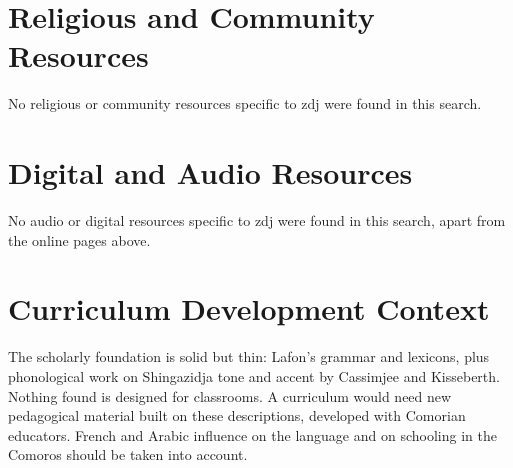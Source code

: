 \documentclass[12pt]{article}
\begin{document}
\section{Religious and Community Resources}
No religious or community resources specific to zdj were found in this search.

\section{Digital and Audio Resources}
No audio or digital resources specific to zdj were found in this search, apart from the online pages above.

\section{Curriculum Development Context}
The scholarly foundation is solid but thin: Lafon's grammar and lexicons, plus phonological work on Shingazidja tone and accent by Cassimjee and Kisseberth. Nothing found is designed for classrooms. A curriculum would need new pedagogical material built on these descriptions, developed with Comorian educators. French and Arabic influence on the language and on schooling in the Comoros should be taken into account.
\end{document}
